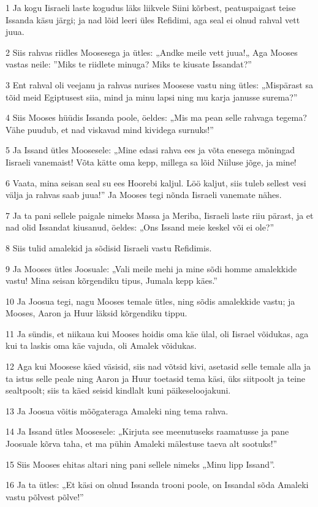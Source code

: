 \par 1 Ja kogu Iisraeli laste kogudus läks liikvele Siini kõrbest, peatuspaigast teise Issanda käsu järgi; ja nad lõid leeri üles Refidimi, aga seal ei olnud rahval vett juua.
\par 2 Siis rahvas riidles Moosesega ja ütles: „Andke meile vett juua!„ Aga Mooses vastas neile: ”Miks te riidlete minuga? Miks te kiusate Issandat?”
\par 3 Ent rahval oli veejanu ja rahvas nurises Moosese vastu ning ütles: „Mispärast sa tõid meid Egiptusest siia, mind ja minu lapsi ning mu karja janusse surema?”
\par 4 Siis Mooses hüüdis Issanda poole, öeldes: „Mis ma pean selle rahvaga tegema? Vähe puudub, et nad viskavad mind kividega surnuks!”
\par 5 Ja Issand ütles Moosesele: „Mine edasi rahva ees ja võta enesega mõningad Iisraeli vanemaist! Võta kätte oma kepp, millega sa lõid Niiluse jõge, ja mine!
\par 6 Vaata, mina seisan seal su ees Hoorebi kaljul. Löö kaljut, siis tuleb sellest vesi välja ja rahvas saab juua!” Ja Mooses tegi nõnda Iisraeli vanemate nähes.
\par 7 Ja ta pani sellele paigale nimeks Massa ja Meriba, Iisraeli laste riiu pärast, ja et nad olid Issandat kiusanud, öeldes: „Ons Issand meie keskel või ei ole?”
\par 8 Siis tulid amalekid ja sõdisid Iisraeli vastu Refidimis.
\par 9 Ja Mooses ütles Joosuale: „Vali meile mehi ja mine sõdi homme amalekkide vastu! Mina seisan kõrgendiku tipus, Jumala kepp käes.”
\par 10 Ja Joosua tegi, nagu Mooses temale ütles, ning sõdis amalekkide vastu; ja Mooses, Aaron ja Huur läksid kõrgendiku tippu.
\par 11 Ja sündis, et niikaua kui Mooses hoidis oma käe ülal, oli Iisrael võidukas, aga kui ta laskis oma käe vajuda, oli Amalek võidukas.
\par 12 Aga kui Moosese käed väsisid, siis nad võtsid kivi, asetasid selle temale alla ja ta istus selle peale ning Aaron ja Huur toetasid tema käsi, üks siitpoolt ja teine sealtpoolt; siis ta käed seisid kindlalt kuni päikeseloojakuni.
\par 13 Ja Joosua võitis mõõgateraga Amaleki ning tema rahva.
\par 14 Ja Issand ütles Moosesele: „Kirjuta see meenutuseks raamatusse ja pane Joosuale kõrva taha, et ma pühin Amaleki mälestuse taeva alt sootuks!”
\par 15 Siis Mooses ehitas altari ning pani sellele nimeks „Minu lipp Issand”.
\par 16 Ja ta ütles: „Et käsi on olnud Issanda trooni poole, on Issandal sõda Amaleki vastu põlvest põlve!”

